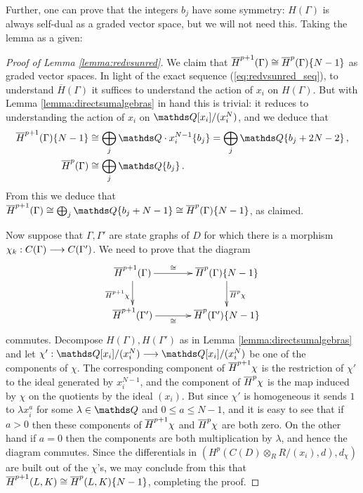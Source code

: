 \documentclass{compositio}
\theoremstyle{definition}
\numberwithin{equation}{section}
\begin{document}
Further, one can prove that the integers $b_j$ have some symmetry: $H(\Gamma)$ is always self-dual as a graded vector space, but we will not need this. Taking the lemma as a given:

\begin{proof}[Proof of Lemma \ref{lemma:redvsunred}] We claim that $\overline{H}^{p+1}(\Gamma) \cong \overline{H}^p(\Gamma)\{N-1\}$ as graded vector spaces. In light of the exact sequence (\ref{eq:redvsunred_seq}), to understand $\overline{H}(\Gamma)$ it suffices to understand the action of $x_i$ on $H(\Gamma)$. But with Lemma \ref{lemma:directsumalgebras} in hand this is trivial: it reduces to understanding the action of $x_i$ on $\QQ[x_i]/(x_i^N)$, and we deduce that
\begin{align*}
\redh^{p+1}(\Gamma)\{N-1\} &\cong \bigoplus_j \QQ \cdot x_i^{N-1} \{ b_j \} = \bigoplus_j \QQ\{b_j + 2N - 2 \} \, ,\\
\redh^p(\Gamma) &\cong \bigoplus_j \QQ \{ b_j \}\,.
\end{align*}
From this we deduce that $\redh^{p+1}(\Gamma) \cong \bigoplus_j \QQ\{b_j + N - 1 \} \cong \redh^p(\Gamma)\{N-1\}$, as claimed.

Now suppose that $\Gamma, \Gamma'$ are state graphs of $D$ for which there is a morphism $\chi_k: C(\Gamma) \longrightarrow C(\Gamma')$. We need to prove that the diagram
\[
\xymatrix@C+1pc{
\redh^{p+1}(\Gamma) \ar[d]_{\redh^{p+1}\chi}\ar[r]^-{\cong} & \redh^p(\Gamma)\{N-1\}\ar[d]^{\redh^p \chi}\\
\redh^{p+1}(\Gamma') \ar[r]_-{\cong} & \redh^p(\Gamma')\{N-1\}
}
\]
commutes. Decompose $H(\Gamma), H(\Gamma')$ as in Lemma \ref{lemma:directsumalgebras} and let $\chi': \QQ[x_i]/(x_i^N) \lto \QQ[x_i]/(x_i^N)$ be one of the components of $\chi$. The corresponding component of $\overline{H}^{p+1} \chi$ is the restriction of $\chi'$ to the ideal generated by $x_i^{N-1}$, and the component of $\overline{H}^p \chi$ is the map induced by $\chi$ on the quotients by the ideal $(x_i)$. But since $\chi'$ is homogeneous it sends $1$ to $\lambda x_i^a$ for some $\lambda \in \QQ$ and $0 \le a \le N - 1$, and it is easy to see that if $a > 0$ then these components of $\overline{H}^{p+1} \chi$ and $\overline{H}^p \chi$ are both zero. On the other hand if $a = 0$ then the components are both multiplication by $\lambda$, and hence the diagram commutes. Since the differentials in $(H^p(C(D) \otimes_R R/(x_i),d), d_\chi)$ are built out of the $\chi$'s, we may conclude from this that $\overline{H}^{p+1}(L,K) \cong \overline{H}^{p}(L,K)\{N-1\}$, completing the proof.
\end{proof}
\end{document}
